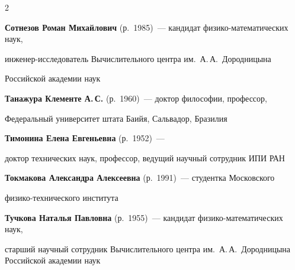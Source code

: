 \begin{multicols}{2}
\vspace*{2pt}








\noindent

\textbf{Сотнезов Роман Михайлович} (р.\ 1985)~--- кандидат фи\-зи\-ко-математических наук,

ин\-же\-нер-ис\-сле\-до\-ва\-тель Вычислительного центра им.\ А.\,А.~Дородницына 

Российской академии наук



\vspace*{2pt}



\noindent

\textbf{Танажура  Клементе А.\,С.} (р.\ 1960)~--- доктор философии, профессор, 

Федеральный университет штата \mbox{Баийя}, Сальвадор, Бразилия



\columnbreak






\noindent

\textbf{Тимонина Елена Евгеньевна} (р.\ 1952)~---

доктор технических наук,  профессор, ведущий научный сотрудник ИПИ РАН



\vspace*{4pt}



\noindent

\textbf{Токмакова Александра Алексеевна} (р.\ 1991)~--- студентка Московского 

фи\-зи\-ко-тех\-ни\-че\-ско\-го института





\vspace*{4pt}



\noindent

\textbf{Тучкова Наталья Павловна} (р.\ 1955)~--- кандидат фи\-зи\-ко-ма\-те\-ма\-ти\-че\-ских наук, 

старший научный сотрудник Вычислительного центра им.\ А.\,А.~Дородницына Российской академии наук




\end{multicols}
